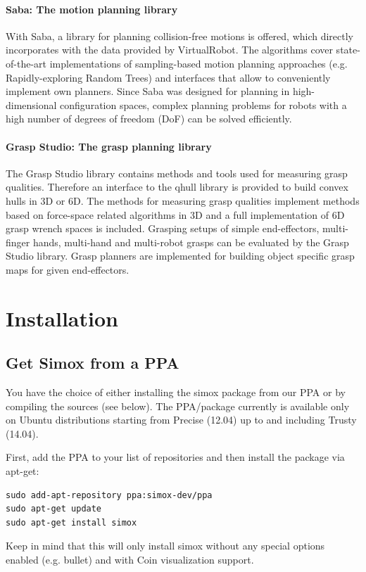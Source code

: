 \documentclass{book}
\begin{document}
\subsubsection{Saba: The motion planning library}
With Saba, a library for planning collision-free motions is offered, which directly incorporates with the data provided by VirtualRobot. The algorithms cover state-of-the-art implementations of sampling-based motion planning approaches (e.g. Rapidly-exploring Random Trees) and interfaces that allow to conveniently implement own planners. Since Saba was designed for planning in high-dimensional configuration spaces, complex planning problems for robots with a high number of degrees of freedom (DoF) can be solved efficiently. 
\subsubsection{Grasp Studio: The grasp planning library}
The Grasp Studio library contains methods and tools used for measuring grasp qualities. Therefore an interface to the qhull library is provided to build convex hulls in 3D or 6D. The methods for measuring grasp qualities implement methods based on force-space related algorithms in 3D and a full implementation of 6D grasp wrench spaces is included. Grasping setups of simple end-effectors, multi-finger hands, multi-hand and multi-robot grasps can be evaluated by the Grasp Studio library. Grasp planners are implemented for building object specific grasp maps for given end-effectors. 
\chapter{Installation}
\section{Get Simox from a PPA}
You have the choice of either installing the simox package from our PPA or by compiling the sources (see below). The PPA/package currently is available only on Ubuntu distributions starting from Precise (12.04) up to and including Trusty (14.04).
\par
First, add the PPA to your list of repositories and then install the package via apt-get: 
\begin{lstlisting}
sudo add-apt-repository ppa:simox-dev/ppa
sudo apt-get update
sudo apt-get install simox
\end{lstlisting}
Keep in mind that this will only install simox without any special options enabled (e.g. bullet) and with Coin visualization support. 
\end{document}
